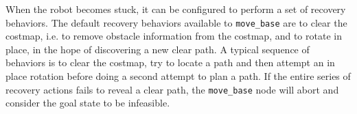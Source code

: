 When the robot becomes stuck, it can be configured to perform a set of recovery behaviors. The default recovery behaviors available to \texttt{move\_base} are to clear the costmap, i.e. to remove obstacle information from the costmap, and to rotate in place, in the hope of discovering a new clear path. A typical sequence of behaviors is to clear the costmap, try to locate a path and then attempt an in place rotation before doing a second attempt to plan a path. If the entire series of recovery actions fails to reveal a clear path, the \texttt{move\_base} node will abort and consider the goal state to be infeasible\cite{koubaa2016robot}.